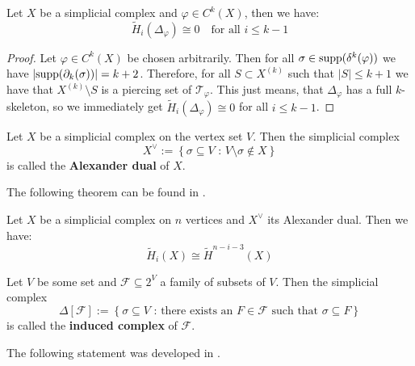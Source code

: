 %      

\begin{thm}
Let \(X\) be a simplicial complex and \(\varphi\in C^k(X)\), then we have:
\[
\tilde{H}_i(\Delta_{\varphi})\cong 0\quad\text{for all }i\leq k-1
\]
\begin{proof}
Let \(\varphi\in C^k(X)\) be chosen arbitrarily. Then for all \(\sigma\in \mathrm{supp}(\delta^k(\varphi))\) we have \(\left|\mathrm{supp}(\partial_k(\sigma))\right|=k+2\). Therefore, for all \(S\subset X^{(k)}\) such that \(\left|S\right|\leq k+1\) we have that \(X^{(k)}\setminus S\) is a piercing set of \(\mathcal{T}_{\varphi}\). This just means, that \(\Delta_{\varphi}\) has a full \(k\)-skeleton, so we immediately get \(\tilde{H}_i(\Delta_{\varphi})\cong 0\) for all \(i\leq k-1\).
\end{proof}
\end{thm}

\begin{defi}
Let \(X\) be a simplicial complex on the vertex set \(V\). Then the simplicial complex
\[
X^{\lor}:=\left\{\sigma\subseteq V\text{ : }V\setminus\sigma\notin X\right\}
\]
is called the \textbf{Alexander dual} of \(X\).
\end{defi}

The following theorem can be found in \cite{8}.

\begin{thm}\label{theorem12}
Let \(X\) be a simplicial complex on \(n\) vertices and \(X^{\lor}\) its Alexander dual. Then we have:
\[
\tilde{H}_i(X)\cong\tilde{H}^{n-i-3}(X)
\]
\end{thm}

\begin{defi}
Let \(V\) be some set and \(\mathcal{F}\subseteq 2^V\) a family of subsets of \(V\). Then the simplicial complex
\[
\Delta\left[\mathcal{F}\right]:=\left\{\sigma\subseteq V\text{ : there exists an }F\in\mathcal{F}\text{ such that }\sigma\subseteq F\right\}
\]
is called the \textbf{induced complex} of \(\mathcal{F}\). 
\end{defi}

The following statement was developed in \cite{9}.

